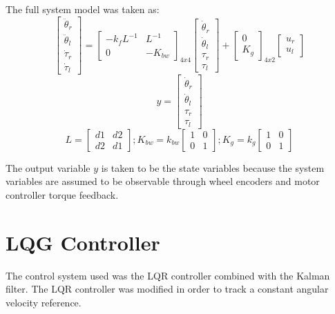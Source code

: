 \documentclass[letterpaper,12pt]{report}
\begin{document}
The full system model was taken as:
\begin{equation}
	\begin{bmatrix}
		\ddot\theta_r \\ \ddot\theta_l \\ \dot\tau_r \\ \dot\tau_l
	\end{bmatrix}
	=
	\begin{bmatrix}
		-k_fL^{-1} & L^{-1} \\
		0 & -K_{bw}
	\end{bmatrix}_{4x4}
	\begin{bmatrix}
		\dot\theta_r \\ \dot\theta_l \\ \tau_r \\ \tau_l
	\end{bmatrix}
	+
	\begin{bmatrix}
		0 \\ K_g
	\end{bmatrix}_{4x2}
	\begin{bmatrix}
		u_r \\ u_l
	\end{bmatrix}
\end{equation}
\begin{equation}
	y = 
	\begin{bmatrix}
		\dot\theta_r \\ \dot\theta_l \\ \tau_r \\ \tau_l
	\end{bmatrix}
\end{equation}
\begin{equation} 
	L = 
	\begin{bmatrix}
		d1 & d2 \\ d2 & d1
	\end{bmatrix}
	; 
	K_{bw} = k_{bw}
	\begin{bmatrix}
		1 & 0 \\ 0 & 1
	\end{bmatrix}
	; 
	K_g = k_g
	\begin{bmatrix}
		1 & 0 \\ 0 & 1
	\end{bmatrix}
\end{equation}

The output variable $y$ is taken to be the state variables because the system variables are assumed to be observable through wheel encoders and
motor controller torque feedback.

\section{LQG Controller}
The control system used was the LQR controller combined with the Kalman filter. The LQR controller was modified in order to track a constant angular velocity reference.
\end{document}

